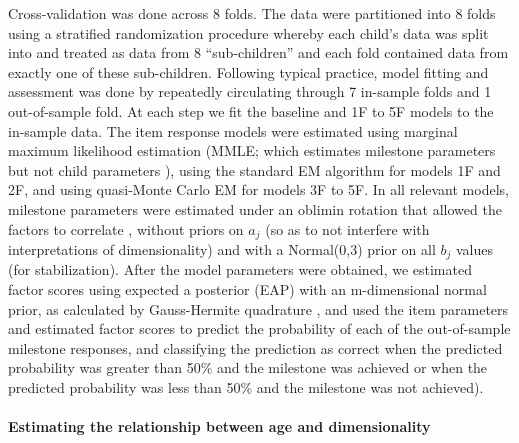 \documentclass[man, floatsintext]{apa7}
\begin{document}
Cross-validation was done across 8 folds. The data were partitioned into 8 folds using a stratified randomization procedure whereby each child's data was split into and treated as data from 8 ``sub-children'' and each fold contained data from exactly one of these sub-children. Following typical practice, model fitting and assessment was done by repeatedly circulating through 7 in-sample folds and 1 out-of-sample fold. At each step we fit the baseline and 1F to 5F models to the in-sample data. The item response models were estimated using marginal maximum likelihood estimation (MMLE; which estimates milestone parameters but not child parameters \parencite{baker2004}), using the standard EM algorithm \parencite{bock1981} for models 1F and 2F, and using quasi-Monte Carlo EM \parencite{jank2005} for models 3F to 5F. In all relevant models, milestone parameters were estimated under an oblimin rotation that allowed the factors to correlate \parencite{jennrich1966}, without priors on $a_j$ (so as to not
interfere with interpretations of dimensionality) and with a Normal(0,3) prior on all $b_j$ values (for stabilization). After the model parameters were obtained, we estimated factor scores using expected a posterior (EAP) with an m-dimensional normal prior, as calculated by Gauss-Hermite quadrature \parencite{embretson2013}, and used the item parameters and estimated factor scores to predict the probability of each of the out-of-sample milestone responses, and classifying the prediction as correct when the predicted probability was greater than 50\% and the milestone was achieved or when the predicted probability was less than 50\% and the
milestone was not achieved).

\paragraph{Estimating the relationship between age and dimensionality}
\end{document}
